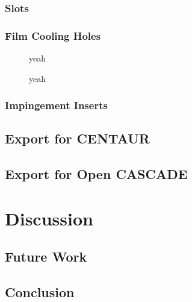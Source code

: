 \documentclass[a4paper, 11pt]{report}
\theoremstyle{definition}
\begin{document}
\subsection{Slots}
\subsection{Film Cooling Holes}
\begin{figure}[!ht]
	\centering
	
	\caption{yeah}
\end{figure}
\begin{figure}[!ht]
	\centering
	
	\caption{yeah}
\end{figure}


\subsection{Impingement Inserts}
\section{Export for CENTAUR}
\section{Export for Open CASCADE}

\chapter{Discussion}
\section{Future Work}
\section{Conclusion}
\cite{Piegl1997}

\printbibliography[heading=bibnumbered, title=References]
\end{document}
